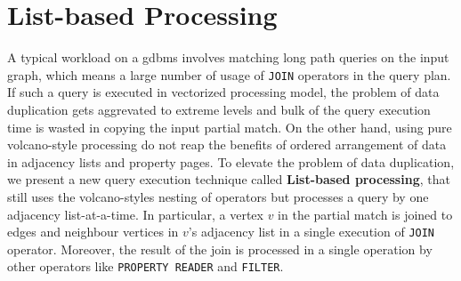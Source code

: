 \section{List-based Processing}
\label{sec:list-based-proc}

A typical workload on a \gls{gdbms} involves matching long path queries on the input graph, which means a large number of usage of \texttt{JOIN} operators in the query plan. If such a query is executed in vectorized processing model, the problem of data duplication gets aggrevated to extreme levels and bulk of the query execution time is wasted in copying the input partial match. On the other hand, using pure volcano-style processing do not reap the benefits of ordered arrangement of data in adjacency lists and property pages. To elevate the problem of data duplication, we present a new query execution technique called \textbf{List-based processing}, that still uses the volcano-styles nesting of operators but processes a query by one adjacency list-at-a-time. In particular, a vertex $v$ in the partial match is joined to edges and neighbour vertices in $v$'s adjacency list in a single execution of \texttt{JOIN} operator. Moreover, the result of the join is processed in a single operation by other operators like \texttt{PROPERTY READER} and \texttt{FILTER}.















